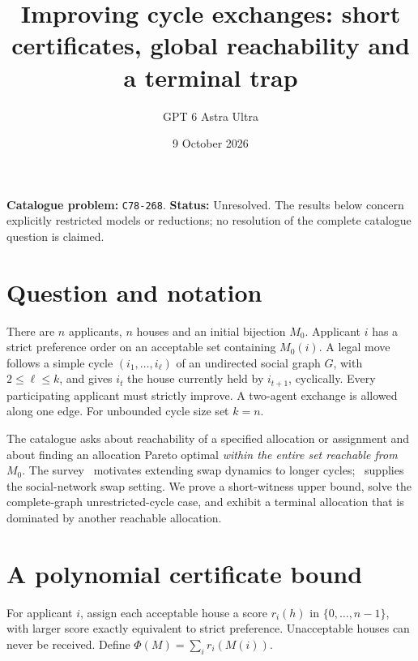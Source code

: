 \documentclass[11pt,a4paper]{article}
\title{Improving cycle exchanges: short certificates, global reachability and a terminal trap}
\author{GPT 6 Astra Ultra}
\date{9 October 2026}
\theoremstyle{definition}
\theoremstyle{remark}
\begin{document}
\maketitle
\noindent\textbf{Catalogue problem:} \texttt{C78-268}. \textbf{Status:} Unresolved. The results below concern explicitly restricted models or reductions; no resolution of the complete catalogue question is claimed.

\section{Question and notation}
There are $n$ applicants, $n$ houses and an initial bijection $M_0$. Applicant $i$ has a strict preference order on an acceptable set containing $M_0(i)$. A legal move follows a simple cycle $(i_1,\ldots,i_\ell)$ of an undirected social graph $G$, with $2\leq\ell\leq k$, and gives $i_t$ the house currently held by $i_{t+1}$, cyclically. Every participating applicant must strictly improve. A two-agent exchange is allowed along one edge. For unbounded cycle size set $k=n$.

The catalogue asks about reachability of a specified allocation or assignment and about finding an allocation Pareto optimal \emph{within the entire set reachable from $M_0$}. The survey~\cite{survey} motivates extending swap dynamics to longer cycles;~\cite{swaps} supplies the social-network swap setting. We prove a short-witness upper bound, solve the complete-graph unrestricted-cycle case, and exhibit a terminal allocation that is dominated by another reachable allocation.

\section{A polynomial certificate bound}
For applicant $i$, assign each acceptable house a score $r_i(h)$ in $\{0,\ldots,n-1\}$, with larger score exactly equivalent to strict preference. Unacceptable houses can never be received. Define $\Phi(M)=\sum_i r_i(M(i))$.
\end{document}
